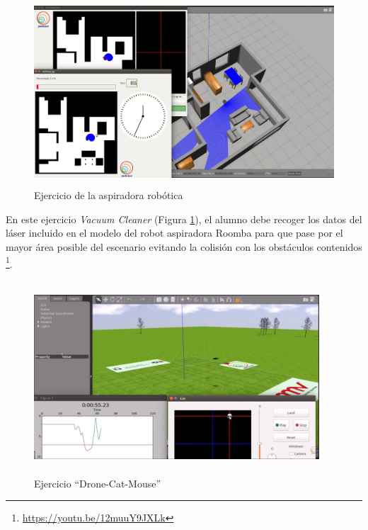 \begin{figure}[H]
  \begin{center}
    \includegraphics[width=0.95\linewidth, height=7cm]{figures/vacuumcleaner.png}
		\caption{Ejercicio de la aspiradora robótica}
		\label{fig.vacuumcleaner}
		\end{center}
\end{figure}

En este ejercicio \textit{Vacuum Cleaner} (Figura \ref{fig.vacuumcleaner}), el alumno debe recoger los datos del láser incluido en el modelo del robot aspiradora Roomba para que pase por el mayor área posible del escenario evitando la colisión con los obstáculos contenidos \footnote{\url{https://youtu.be/12muuY9JXLk}}.

\begin{figure}[H]
  \begin{center}
    \includegraphics[width=0.95\textwidth, height=7.2cm]{figures/dronecatmouse.png}
		\caption{Ejercicio ``Drone-Cat-Mouse''}
		\label{fig.dronecatmouse}
		\end{center}
\end{figure}

